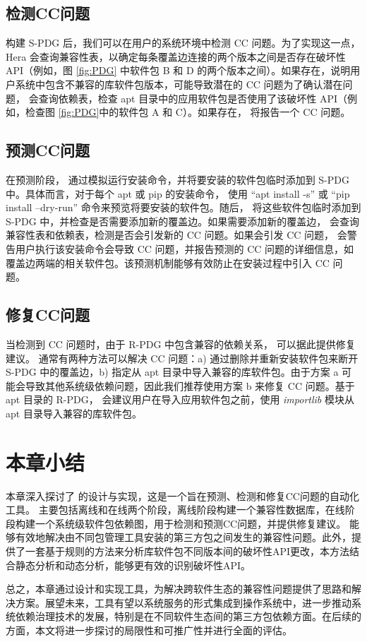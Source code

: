 \subsection{检测CC问题}\label{4.2.2}
构建 S-PDG 后，我们可以在用户的系统环境中检测 CC 问题。为了实现这一点，Hera 会查询兼容性表，以确定每条覆盖边连接的两个版本之间是否存在破坏性 API（例如，图 \ref{fig:PDG} 中软件包 B 和 D 的两个版本之间）。如果存在，说明用户系统中包含不兼容的库软件包版本，可能导致潜在的 CC 问题为了确认潜在问题，\tool{} 会查询依赖表，检查 apt 目录中的应用软件包是否使用了该破坏性 API（例如，检查图 \ref{fig:PDG}中的软件包 A 和 C）。如果存在，\tool{} 将报告一个 CC 问题。

\subsection{预测CC问题}\label{4.2.3}
在预测阶段，\tool{} 通过模拟运行安装命令，并将要安装的软件包临时添加到 S-PDG 中。具体而言，对于每个 apt 或 pip 的安装命令，\tool{} 使用 “apt install -s” 或 “pip install --dry-run” 命令来预览将要安装的软件包。随后，\tool{} 将这些软件包临时添加到 S-PDG 中，并检查是否需要添加新的覆盖边。如果需要添加新的覆盖边，\tool{} 会查询兼容性表和依赖表，检测是否会引发新的 CC 问题。如果会引发 CC 问题，\tool{} 会警告用户执行该安装命令会导致 CC 问题，并报告预测的 CC 问题的详细信息，如覆盖边两端的相关软件包。该预测机制能够有效防止在安装过程中引入 CC 问题。

\subsection{修复CC问题}\label{4.2.4}
当检测到 CC 问题时，由于 R-PDG 中包含兼容的依赖关系，\tool{} 可以据此提供修复建议。
通常有两种方法可以解决 CC 问题：a) 通过删除并重新安装软件包来断开 S-PDG 中的覆盖边，b) 指定从 apt 目录中导入兼容的库软件包。由于方案 a 可能会导致其他系统级依赖问题，因此我们推荐使用方案 b 来修复 CC 问题。基于 apt 目录的 R-PDG，\tool{} 会建议用户在导入应用软件包之前，使用 \textit{importlib} 模块从 apt 目录导入兼容的库软件包。

\section{本章小结}
本章深入探讨了 \tool{}的设计与实现，这是一个旨在预测、检测和修复CC问题的自动化工具。 \tool{}主要包括离线和在线两个阶段，离线阶段构建一个兼容性数据库，在线阶段构建一个系统级软件包依赖图，用于检测和预测CC问题，并提供修复建议。\tool{} 能够有效地解决由不同包管理工具安装的第三方包之间发生的兼容性问题。此外，\tool{}提供了一套基于规则的方法来分析库软件包不同版本间的破坏性API更改，本方法结合静态分析和动态分析，能够更有效的识别破坏性API。

总之，本章通过设计和实现\tool{}工具，为解决跨软件生态的兼容性问题提供了思路和解决方案。展望未来，\tool{}工具有望以系统服务的形式集成到操作系统中，进一步推动系统依赖治理技术的发展，特别是在不同软件生态间的第三方包依赖方面。在后续的方面，本文将进一步探讨\tool{}的局限性和可推广性并进行全面的评估。